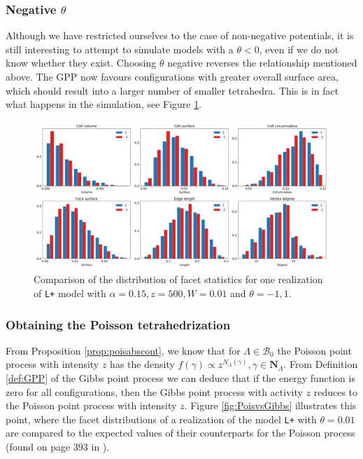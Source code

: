 \subsubsection{ Negative $\theta$ }
Although we have restricted ourselves to the case of non-negative potentials, it is still interesting to attempt to simulate models with a $\theta<0$, even if we do not know whether they exist. Choosing $\theta$ negative reverses the relationship mentioned above. The GPP now favours configurations with greater overall surface area, which should result into a larger number of smaller tetrahedra. This is in fact what happens in the simulation, see Figure \ref{fig:thetanegative}.


\begin{figure}
  \centering
    \includegraphics[width=1\textwidth]{../img/numeric/facets_1_-1-1.png}
  \caption{Comparison of the distribution of facet statistics for one realization of \texttt{L+} model with $\alpha=0.15,z=500,W=0.01$ and $\theta = -1,1$.  }
  \label{fig:thetanegative}
\end{figure}




\subsubsection{Obtaining the Poisson tetrahedrization}
From Proposition \ref{prop:poisabscont}, we know that for $\Lambda \in \mathcal B_0$ the Poisson point process with intensity $z$ has the density $f(\gamma)\propto z^{N_\Lambda(\gamma)}, \gamma \in \mathbf N_\Lambda$. From Definition \ref{def:GPP} of the Gibbs point process we can deduce that if the energy function is zero for all configurations, then the Gibbs point process with activity $z$ reduces to the Poisson point process with intensity $z$.  Figure \ref{fig:PoisvsGibbs} illustrates this point, where the facet distributions of a realization of the model \texttt{L+} with $\theta=0.01$ are compared to the expected values of their counterparts for the Poisson process (found on page $393$ in \cite{Okabe1992}).


